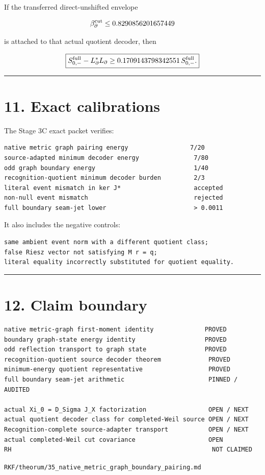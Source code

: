If the transferred direct-unshifted envelope

\[
\beta_\partial^{\rm cut}
\le0.8290856201657449
\]

is attached to that actual quotient decoder, then

\[
\boxed{
S_{0,-}^{\rm full}-L_\partial^*L_\partial
\ge
0.1709143798342551\,S_{0,-}^{\rm full}.
}
\]

\begin{center}\rule{0.5\linewidth}{0.5pt}\end{center}

\hypertarget{exact-calibrations}{%
\section{11. Exact calibrations}\label{exact-calibrations}}

The Stage 3C exact packet verifies:

\begin{verbatim}
native metric graph pairing energy                 7/20
source-adapted minimum decoder energy               7/80
odd graph boundary energy                           1/40
recognition-quotient minimum decoder burden         2/3
literal event mismatch in ker J*                    accepted
non-null event mismatch                             rejected
full boundary seam-jet lower                        > 0.0011
\end{verbatim}

It also includes the negative controls:

\begin{verbatim}
same ambient event norm with a different quotient class;
false Riesz vector not satisfying M r = q;
literal equality incorrectly substituted for quotient equality.
\end{verbatim}

\begin{center}\rule{0.5\linewidth}{0.5pt}\end{center}

\hypertarget{claim-boundary}{%
\section{12. Claim boundary}\label{claim-boundary}}

\begin{verbatim}
native metric-graph first-moment identity              PROVED
boundary graph-state energy identity                   PROVED
odd reflection transport to graph state                PROVED
recognition-quotient source decoder theorem             PROVED
minimum-energy quotient representative                  PROVED
full boundary seam-jet arithmetic                       PINNED / AUDITED

actual Xi_0 = D_Sigma J_X factorization                 OPEN / NEXT
actual quotient decoder class for completed-Weil source OPEN / NEXT
Recognition-complete source-adapter transport           OPEN / NEXT
actual completed-Weil cut covariance                    OPEN
RH                                                       NOT CLAIMED
\end{verbatim}

\begin{flushright}\small\texttt{RKF/theorum/35\_native\_metric\_graph\_boundary\_pairing.md}\end{flushright}
